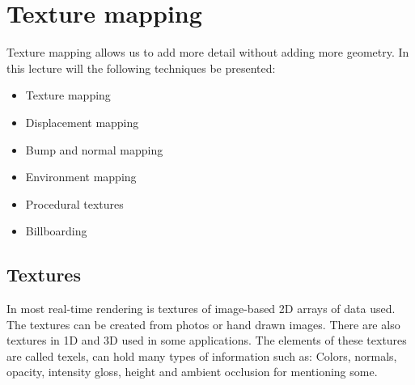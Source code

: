 \section{Texture mapping}
Texture mapping allows us to add more detail without adding more geometry. In this lecture will the following techniques be presented:

	\begin{itemize}
		\item Texture mapping
		\item Displacement mapping
		\item Bump and normal mapping
		\item Environment mapping
		\item Procedural textures
		\item Billboarding
	\end{itemize}


	\subsection*{Textures}
	In most real-time rendering is textures of image-based 2D arrays of data used. The textures can be created from photos or hand drawn images. There are also textures in 1D and 3D used in some applications. The elements of these textures are called texels, can hold many types of information such as: Colors, normals, opacity, intensity gloss, height and ambient occlusion for mentioning some. 